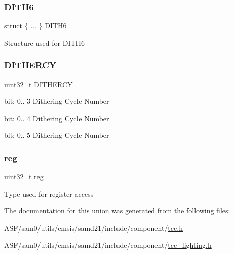 \subsubsection{\texorpdfstring{DITH6}{DITH6}\hspace{0.1cm}{\footnotesize\ttfamily [2/2]}}
{\footnotesize\ttfamily struct \{ ... \}   D\+I\+T\+H6}

Structure used for D\+I\+T\+H6 \mbox{\label{union_t_c_c___c_c___type_a1e7fc84641e39de898f29ee9268f22aa}} 
\subsubsection{\texorpdfstring{DITHERCY}{DITHERCY}}
{\footnotesize\ttfamily uint32\+\_\+t D\+I\+T\+H\+E\+R\+CY}

bit\+: 0.. 3 Dithering Cycle Number

bit\+: 0.. 4 Dithering Cycle Number

bit\+: 0.. 5 Dithering Cycle Number \mbox{\label{union_t_c_c___c_c___type_a6b91636401516a477989a336376d7b40}} 
\subsubsection{\texorpdfstring{reg}{reg}}
{\footnotesize\ttfamily uint32\+\_\+t reg}

Type used for register access 

The documentation for this union was generated from the following files\+:\begin{DoxyCompactItemize}
\item 
A\+S\+F/sam0/utils/cmsis/samd21/include/component/\mbox{\hyperlink{tcc_8h}{tcc.\+h}}\item 
A\+S\+F/sam0/utils/cmsis/samd21/include/component/\mbox{\hyperlink{tcc__lighting_8h}{tcc\+\_\+lighting.\+h}}\end{DoxyCompactItemize}
